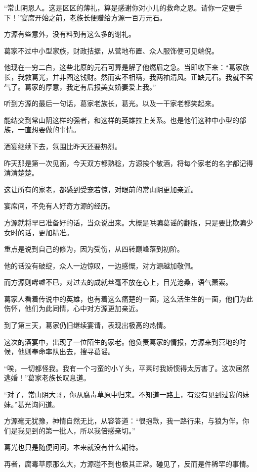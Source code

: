 \begin{this_body}
“常山阴恩人。这是区区的薄礼，算是感谢你对小儿的救命之恩。请你一定要手下！”宴席开始之前，老族长便赠给方源一百万元石。

方源有些意外，没有料到有这么多的谢礼。

葛家不过中小型家族，财政拮据，从营地布置、众人服饰便可见端倪。

他现在一穷二白，这些北原的元石可算是解了他燃眉之急。当即收下来：“葛家族长，我救葛光，并非图这钱财。然而实不相瞒，我两袖清风。正缺元石。我就不客气了。葛家的厚意，我定有后报美女娇妻爱上我。”

听到方源的最后一句话，葛家老族长，葛光。以及一干家老都笑起来。

能结交到常山阴这样的强者，和这样的英雄拉上关系。也是他们这种中小型的部族，一直想要做的事情。

酒宴继续下去，氛围比昨天还要热烈。

昨天那是第一次见面，今天双方都熟稔，方源挨个敬酒，将每个家老的名字都记得清清楚楚。

这让所有的家老，都感到受宠若惊，对眼前的常山阴更加亲近。

宴席间，不免有人好奇方源的经历。

方源就将早已准备好的话，当众说出来。大概是哄骗葛谣的翻版，只是要比欺骗少女时的话，更加精准。

重点是说到自己的修为，因为受伤，从四转巅峰落到初阶。

他的话没有破绽，众人一边惊叹，一边感慨，对方源越加敬佩。

而方源则唏嘘不已，对过去的成就丝毫不放在心上，目光沧桑，语气萧索。

葛家人看着传说中的英雄，也有着这么痛楚的一面，这么活生生的一面，他们为此伤怀，他们为此同情，心中对方源更加亲近。

到了第三天，葛家仍旧继续宴请，表现出极高的热情。

这次的酒宴中，出现了一位陌生的家老。他负责葛家的情报，方源来到营地的时候，他则奉命率队出去，搜寻葛谣。

“唉，一切都怪我。我有一个刁蛮的小丫头，平素时我娇惯得太厉害了。这次居然逃婚！”葛家老族长叹息道。

“对了，常山阴大哥，你从腐毒草原中归来。不知道一路上，有没有见到过我的妹妹。”葛光询问道。

方源毫无犹豫，神情自然无比，从容答道：“很抱歉，我一路行来，与狼为伴。你们是我见到的第一批人，所以我倍感亲切。”

葛光也只是随便问问，本来就没有什么期待。

再者，腐毒草原那么大，方源碰不到也极其正常。碰见了，反而是件稀罕的事情。


\end{this_body}
